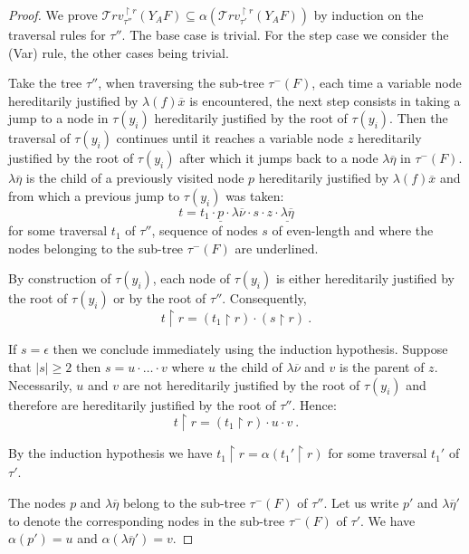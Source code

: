 \documentclass{article}
\newcommand{\travset}{\mathcal{T}rv}
\begin{document}
\begin{proof}
We prove $\travset^{\upharpoonright r}_{\tau''}(Y_A F) \subseteq \alpha(\travset^{\upharpoonright r}_{\tau'}(Y_A F))$ by induction on the traversal rules for $\tau''$.
The base case is trivial. For the step case we consider the (Var) rule, the other cases being trivial.

Take the tree $\tau''$, when traversing the sub-tree $\tau^-(F)$, each time a variable node hereditarily justified by $\lambda (f) \overline{x}$ is encountered, the next step consists in taking a jump to a node in $\tau(y_i)$ hereditarily justified by the root of $\tau(y_i)$. Then the traversal of $\tau(y_i)$ continues until it reaches a variable node $z$ hereditarily justified by the root of $\tau(y_i)$ after which it jumps back to a node $\lambda \overline{\eta}$ in $\tau^-(F)$. $\lambda \overline{\eta}$ is the child of a previously visited node $p$ hereditarily justified by $\lambda (f) \overline{x}$ and from which a previous jump to $\tau(y_i)$ was taken:
$$ t = t_1 \cdot \underline{p} \cdot \lambda \overline{\nu} \cdot s \cdot z \cdot \underline{\lambda \overline{\eta}}$$
for some traversal $t_1$ of $\tau''$, sequence of nodes $s$ of even-length and where the nodes belonging to the sub-tree $\tau^-(F)$ are underlined.

By construction of $\tau(y_i)$, each node of $\tau(y_i)$ is either hereditarily justified by the root of $\tau(y_i)$
or by the root of $\tau''$. Consequently,
$$ t\upharpoonright r = (t_1\upharpoonright r) \cdot  (s \upharpoonright r) \ .$$

If $s = \epsilon$ then we conclude immediately using the induction hypothesis.
Suppose that $|s|\geq 2$ then $s = u\cdot \ldots \cdot v$ where $u$ the child of $\lambda \overline{\nu}$ and $v$ is the parent of $z$.
Necessarily, $u$ and $v$ are not hereditarily justified by the root of $\tau(y_i)$ and therefore are hereditarily justified by the root of $\tau''$. Hence:
$$ t\upharpoonright r = (t_1\upharpoonright r) \cdot  u \cdot v \ .$$

By the  induction hypothesis we have $t_1\upharpoonright r = \alpha(t_1'\upharpoonright r)$ for some traversal $t_1'$  of $\tau'$.

The nodes $p$ and $\lambda \overline{\eta}$ belong
to the sub-tree $\tau^-(F)$ of $\tau''$. Let us write $p'$ and $\lambda \overline{\eta}'$ to denote the corresponding nodes in the sub-tree $\tau^-(F)$ of $\tau'$. We have $\alpha(p') = u$ and $\alpha(\lambda \overline{\eta}') = v$.


\end{proof}
\end{document}
